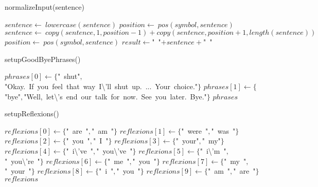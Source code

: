 \documentclass[a4paper,10pt]{article}
\begin{document}
\begin{algorithm}
\caption{normalizeInput(sentence)}
\begin{algorithmic}[5]

\STATE {}
\STATE {}
\STATE {}
  \STATE \(sentence\gets\ lowercase(sentence)\)
    \STATE \(position\gets\ pos(symbol,sentence)\)
      \STATE \(sentence\gets\ copy(sentence,1,position-1)+copy(sentence,position+1,length(sentence))\)
      \STATE \(position\gets\ pos(symbol,sentence)\)
    \ENDWHILE
  \ENDFOR
  \STATE \(result\gets\)"{}\ "{}\(+sentence+\)"{}\ "{}\(\)

\end{algorithmic}
\end{algorithm}


\begin{algorithm}
\caption{setupGoodByePhrases()}
\begin{algorithmic}[5]

  \STATE \(phrases[0]\gets\{\)"{}\ shut"{}\(,\)"{}Okay.\ If\ you\ feel\ that\ way\ I\textbackslash{}'{}ll\ shut\ up.\ ...\ Your\ choice."{}\(\}\)
  \STATE \(phrases[1]\gets\{\)"{}bye"{}\(,\)"{}Well,\ let\textbackslash{}'{}s\ end\ our\ talk\ for\ now.\ See\ you\ later.\ Bye."{}\(\}\)
  \RETURN\(phrases\)

\end{algorithmic}
\end{algorithm}


\begin{algorithm}
\caption{setupReflexions()}
\begin{algorithmic}[5]

\STATE {}
  \STATE \(reflexions[0]\gets\{\)"{}\ are\ "{}\(,\)"{}\ am\ "{}\(\}\)
  \STATE \(reflexions[1]\gets\{\)"{}\ were\ "{}\(,\)"{}\ was\ "{}\(\}\)
  \STATE \(reflexions[2]\gets\{\)"{}\ you\ "{}\(,\)"{}\ I\ "{}\(\}\)
  \STATE \(reflexions[3]\gets\{\)"{}\ your"{}\(,\)"{}\ my"{}\(\}\)
  \STATE \(reflexions[4]\gets\{\)"{}\ i\textbackslash{}'{}ve\ "{}\(,\)"{}\ you\textbackslash{}'{}ve\ "{}\(\}\)
  \STATE \(reflexions[5]\gets\{\)"{}\ i\textbackslash{}'{}m\ "{}\(,\)"{}\ you\textbackslash{}'{}re\ "{}\(\}\)
  \STATE \(reflexions[6]\gets\{\)"{}\ me\ "{}\(,\)"{}\ you\ "{}\(\}\)
  \STATE \(reflexions[7]\gets\{\)"{}\ my\ "{}\(,\)"{}\ your\ "{}\(\}\)
  \STATE \(reflexions[8]\gets\{\)"{}\ i\ "{}\(,\)"{}\ you\ "{}\(\}\)
  \STATE \(reflexions[9]\gets\{\)"{}\ am\ "{}\(,\)"{}\ are\ "{}\(\}\)
  \RETURN\(reflexions\)

\end{algorithmic}
\end{algorithm}
\end{document}

